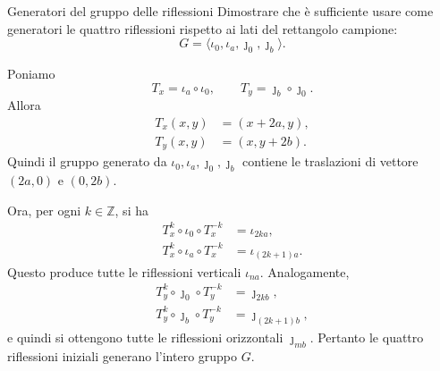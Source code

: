 \documentclass[a4paper]{article}
\begin{document}
\begin{center}
\end{center}

\begin{snippetexercise}{Generatori del gruppo delle riflessioni}
Dimostrare che è sufficiente usare come generatori le quattro riflessioni rispetto ai lati del rettangolo campione:
\[
    G=\langle \iota_0,\iota_a,\jmath_0,\jmath_b\rangle.
\]
\end{snippetexercise}

\begin{snippetsolution}{}
Poniamo
\[
    T_x=\iota_a\circ \iota_0,
    \qquad
    T_y=\jmath_b\circ \jmath_0.
\]
Allora
\begin{align*}
    T_x(x,y)&=(x+2a,y),\\
    T_y(x,y)&=(x,y+2b).
\end{align*}
Quindi il gruppo generato da \(\iota_0,\iota_a,\jmath_0,\jmath_b\) contiene le traslazioni di vettore \((2a,0)\) e \((0,2b)\).

Ora, per ogni \(k\in \mathbb{Z}\), si ha
\begin{align*}
    T_x^k\circ \iota_0\circ T_x^{-k}&=\iota_{2ka},\\
    T_x^k\circ \iota_a\circ T_x^{-k}&=\iota_{(2k+1)a}.
\end{align*}
Questo produce tutte le riflessioni verticali \(\iota_{na}\). Analogamente,
\begin{align*}
    T_y^k\circ \jmath_0\circ T_y^{-k}&=\jmath_{2kb},\\
    T_y^k\circ \jmath_b\circ T_y^{-k}&=\jmath_{(2k+1)b},
\end{align*}
e quindi si ottengono tutte le riflessioni orizzontali \(\jmath_{mb}\). Pertanto le quattro riflessioni iniziali generano l'intero gruppo \(G\).
\end{snippetsolution}
\end{document}
